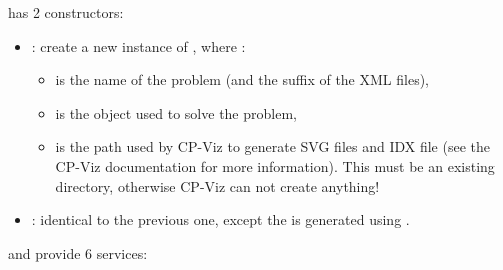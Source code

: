 \medskip
{} has 2 constructors:
\begin{itemize}
\item {}: create a new instance of , where : 
	\begin{itemize}
	\item {} is the name of the problem (and the suffix of the XML files), 
	\item {} is the  object used to solve the problem,
	\item {} is the path used by CP-Viz to generate SVG files and IDX file (see the CP-Viz documentation for more information). This must be an existing directory, otherwise CP-Viz can not create anything!
	\end{itemize}

\item {}: identical to the previous one, except the  is generated using .
\end{itemize}
and provide 6 services:
